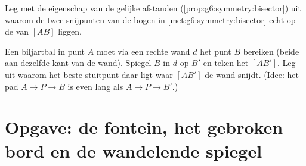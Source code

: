 \begin{exercise}[$\star\star$]\label{exo:g6:symmetry:11}
Leg met de eigenschap van de gelijke afstanden
(\cref{prop:g6:symmetry:bisector}) uit waarom de twee snijpunten van de bogen in
\cref{met:g6:symmetry:bisector} echt op de  van $[AB]$ liggen.
\end{exercise}

\begin{exercise}[$\star\star\star$]\label{exo:g6:symmetry:12}
Een biljartbal in punt $A$ moet via een rechte wand $d$ het punt $B$ bereiken
(beide aan dezelfde kant van de wand). Spiegel $B$ in $d$ op $B'$ en teken het
 $[AB']$. Leg uit waarom het beste stuitpunt daar ligt waar $[AB']$ de
wand snijdt. (Idee: het pad $A \to P \to B$ is even lang als
$A \to P \to B'$.)
\end{exercise}

\section{Opgave: de fontein, het gebroken bord en de wandelende spiegel}


